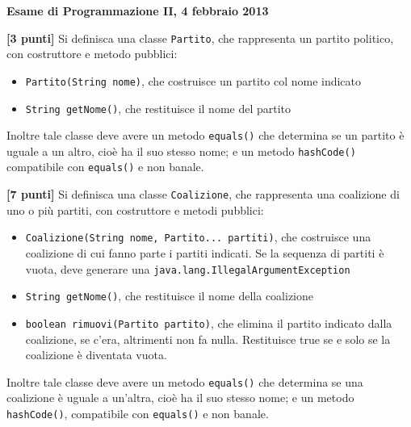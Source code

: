 \documentclass{article}[10pt]
\newcounter{esnu}
\newenvironment{esercizio}{\medskip \noindent {\bf Esercizio\addtocounter{esnu}{1} \arabic{esnu}}}{}
\begin{document}
\begin{center} {\bf Esame di Programmazione II, 4 febbraio 2013}\end{center}

\begin{esercizio}
\textbf{[3 punti]}
%
Si definisca una classe \texttt{Partito}, che rappresenta un partito politico,
con costruttore e metodo pubblici:
%
\begin{itemize}
\item \texttt{Partito(String nome)}, che costruisce un partito col nome indicato
\item \texttt{String getNome()}, che restituisce il nome del partito
\end{itemize}
%
Inoltre tale classe deve avere un metodo \texttt{equals()} che determina se un partito
\`e uguale a un altro, cio\`e ha il suo stesso nome; e un metodo \texttt{hashCode()}
compatibile con \texttt{equals()} e non banale.
\end{esercizio}

\begin{esercizio}
\textbf{[7 punti]}
%
Si definisca una classe \texttt{Coalizione}, che rappresenta una coalizione di uno o pi\`u
partiti, con costruttore e metodi pubblici:
%
\begin{itemize}
\item \texttt{Coalizione(String nome, Partito... partiti)}, che costruisce una coalizione
      di cui fanno parte i partiti indicati. Se la sequenza di partiti \`e vuota,
      deve generare una \texttt{java.lang.IllegalArgumentException}
\item \texttt{String getNome()}, che restituisce il nome della coalizione
\item \texttt{boolean rimuovi(Partito partito)}, che elimina il partito indicato dalla coalizione,
      se c'era, altrimenti non fa nulla. Restituisce true se e solo se la coalizione \`e diventata
      vuota.
\end{itemize}
%
Inoltre tale classe deve avere un metodo \texttt{equals()} che determina se una coalizione
\`e uguale a un'altra, cio\`e ha il suo stesso nome; e un metodo \texttt{hashCode()},
compatibile con \texttt{equals()} e non banale.
\end{esercizio}
\end{document}
